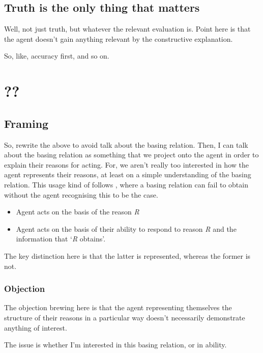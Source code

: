 \documentclass[10pt]{article}
\begin{document}
\subsection{Truth is the only thing that matters}
\label{sec:truth-only-thing}

Well, not just truth, but whatever the relevant evaluation is.
Point here is that the agent doesn't gain anything relevant by the constructive explanation.

So, like, accuracy first, and so on.

\section{??}

\subsection{Framing}
\label{sec:framing}

So, rewrite the above to avoid talk about the basing relation.
Then, I can talk about the basing relation as something that we project onto the agent in order to explain their reasons for acting.
For, we aren't really too interested in how the agent represents their reasons, at least on a simple understanding of the basing relation.
This usage kind of follows \textcite[e.g.\ 197]{Neta:2019aa}, where a basing relation can fail to obtain without the agent recognising this to be the case.

\begin{itemize}
\item Agent acts on the basis of the reason \emph{R}
\item Agent acts on the basis of their ability to respond to reason \emph{R} and the information that `\emph{R} obtains'.
\end{itemize}

The key distinction here is that the latter is represented, whereas the former is not.

\subsubsection{Objection}

The objection brewing here is that the agent representing themselves the structure of their reasons in a particular way doesn't necessarily demonstrate anything of interest.

The issue is whether I'm interested in this basing relation, or in ability.
\end{document}
